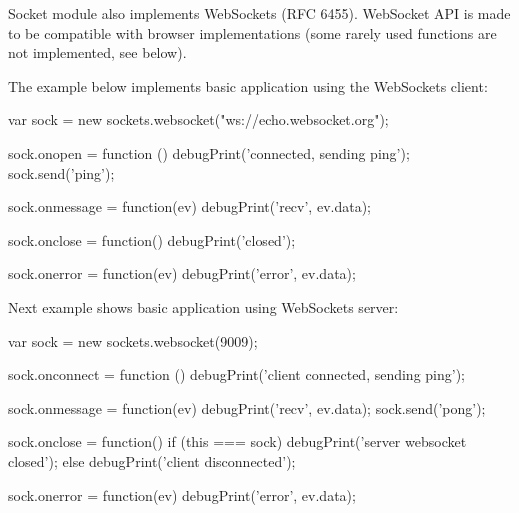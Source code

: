 Socket module also implements WebSockets (RFC 6455). WebSocket API is made to be
compatible with browser implementations (some rarely used functions are not
implemented, see below).

The example below implements basic application using the WebSockets client:

\begin{listingverbatim}
var sock = new sockets.websocket("ws://echo.websocket.org");

sock.onopen = function () {
    debugPrint('connected, sending ping');
    sock.send('ping');
}

sock.onmessage = function(ev) {
    debugPrint('recv', ev.data);
}

sock.onclose = function() {
    debugPrint('closed');
}

sock.onerror = function(ev) {
    debugPrint('error', ev.data);
}
\end{listingverbatim}

Next example shows basic application using WebSockets server:

\begin{listingverbatim}
var sock = new sockets.websocket(9009);

sock.onconnect = function () {
    debugPrint('client connected, sending ping');
}

sock.onmessage = function(ev) {
    debugPrint('recv', ev.data);
    sock.send('pong');
}

sock.onclose = function() {
    if (this === sock) {
        debugPrint('server websocket closed');
    } else {
        debugPrint('client disconnected');
    }
}

sock.onerror = function(ev) {
    debugPrint('error', ev.data);
}
\end{listingverbatim}


